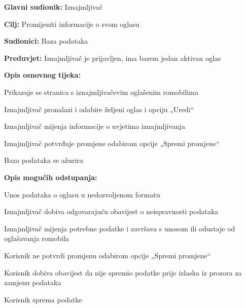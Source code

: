 						\noindent {}
						\begin{packed_item}
							
							\item \textbf{Glavni sudionik: }Iznajmljivač
							\item  \textbf{Cilj: }Promijeniti informacije o svom oglasu
							\item  \textbf{Sudionici: }Baza podataka
							\item  \textbf{Preduvjet: }Iznajmljivač je prijavljen, ima barem jedan aktivan oglas
							\item  \textbf{Opis osnovnog tijeka:}
							
							\item[] \begin{packed_enum}
								\item Prikazuje se stranica s iznajmljivačevim oglašenim romobilima
								\item Iznajmljivač pronalazi i odabire željeni oglas i opciju „Uredi“
								\item Iznajmljivač mijenja informacije o uvjetima iznajmljivanja
								\item Iznajmljivač potvrđuje promjene odabirom opcije „Spremi promjene“
								\item Baza podataka se ažurira
								
							\end{packed_enum}	
							\item  \textbf{Opis mogućih odstupanja:}
							
							\item[] \begin{packed_item}
								
								\item[3.a] Unos podataka o oglasu u nedozvoljenom formatu
								\item[] \begin{packed_enum}
									
									\item Iznajmljivač dobiva odgovarajuću obavijest o neispravnosti podataka
									\item Iznajmljivač mijenja potrebne podatke i završava s unosom ili odustaje od oglašavanja romobila
									
								\end{packed_enum}
								\item[4.a] Korisnik ne potvrdi promjenu odabirom opcije „Spremi promjene“
								\item[] \begin{packed_enum}
									
									\item Korisnik dobiva obavijest da nije spremio podatke prije izlaska iz prozora za zamjenu podataka
									\item Korisnik sprema podatke
									
								\end{packed_enum}
								
							\end{packed_item}
						\end{packed_item}
